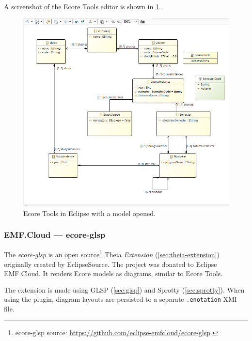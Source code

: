 A screenshot of the Ecore Tools editor is shown in \cref{fig:ecore-tools-screenshot}.

\begin{figure}[htbp]  %
  \centering
  \includegraphics[width=\textwidth]{figures/ecore-eclipse-sirius-aird-graphical-editor.png}
  \caption[Ecore Tools Screenshot]{Ecore Tools in \gls{Eclipse} with a model opened.}\label{fig:ecore-tools-screenshot}
\end{figure}


\subsubsection{EMF.Cloud --- ecore-glsp}\label{sec:ecore-glsp} %
The \emph{ecore-glsp} is an \gls{open source}\footnote{ecore-glsp source: \href{https://github.com/eclipse-emfcloud/ecore-glsp}{https://github.com/eclipse-emfcloud/ecore-glsp}.} \gls{Theia} \emph{Extension} (\cref{sec:theia-extension}) originally created by EclipseSource.
The project was donated to Eclipse EMF.Cloud.
It renders \gls{Ecore} models as diagrams, similar to Ecore Tools.

The extension is made using \gls{GLSP} (\cref{sec:glsp}) and Sprotty (\cref{sec:sprotty}).
When using the plugin, diagram layouts are persisted to a separate \texttt{.enotation} \gls{XMI} file.~\cite{camilleletavernierEclipseemfcloudEcoreglsp2020}

